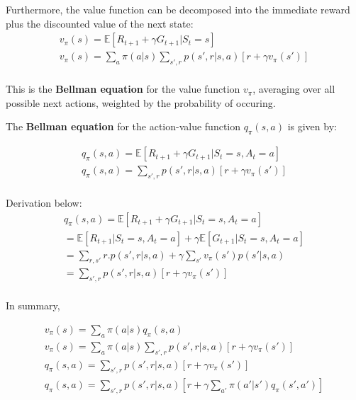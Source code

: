  Furthermore, the value function can be decomposed into the immediate reward plus the discounted value of the next state:
 \begin{equation}
    \begin{split}
        v_\pi(s) = \mathbb{E}[R_{t+1} + \gamma G_{t+1} | S_t = s] \\
        v_\pi(s) = \sum_{a} \pi(a|s) \sum_{s',r} p(s',r|s, a) [r + \gamma v_\pi(s')] \\
        \label{eq:mdp-bellman-equation-2}
    \end{split}
 \end{equation}

 This is the \textbf{Bellman equation} for the value function $v_\pi$, averaging over all possible next actions, weighted
 by the probability of occuring.

The \textbf{Bellman equation} for the action-value function $q_\pi(s, a)$ is given by:

  \begin{equation}
    \begin{split}
       q_\pi(s, a) = \mathbb{E}[R_{t+1} + \gamma G_{t+1} | S_t = s, A_t = a] \\
       q_\pi(s, a) = \sum_{s',r} p(s',r|s, a) [r + \gamma v_\pi(s')] \\
       \label{eq:mdp-bellman-equation-3}
    \end{split}
 \end{equation}

 Derivation below:
 \begin{equation}
    \begin{split}
        q_\pi(s, a) = \mathbb{E}[R_{t+1} + \gamma G_{t+1} | S_t = s, A_t = a] \\
        = \mathbb{E}[R_{t+1} | S_t = s, A_t = a]  + \gamma \mathbb{E}[G_{t+1} | S_t = s, A_t = a] \\
        = \sum_{r,s'} r . p(s',r|s, a) + \gamma \sum_{s'} v_\pi(s') p(s'|s, a) \\
        = \sum_{s',r} p(s',r|s, a) [r + \gamma v_\pi(s')] \\
        \label{eq:mdp-bellman-equation-4}
    \end{split}
 \end{equation}

 In summary,

 \begin{equation}
    \begin{split}
        v_\pi(s) = \sum_{a} \pi(a|s) q_\pi(s, a) \\
        v_\pi(s) = \sum_{a} \pi(a|s) \sum_{s',r} p(s',r|s, a) [r + \gamma v_\pi(s')] \\
        q_\pi(s, a) = \sum_{s',r} p(s',r|s, a) [r + \gamma v_\pi(s')] \\
        q_\pi(s, a) = \sum_{s',r} p(s',r|s, a) [r + \gamma \sum_{a'} \pi(a'|s') q_\pi(s', a')] \\
        \label{eq:mdp-bellman-equation-5}
    \end{split}
 \end{equation}


